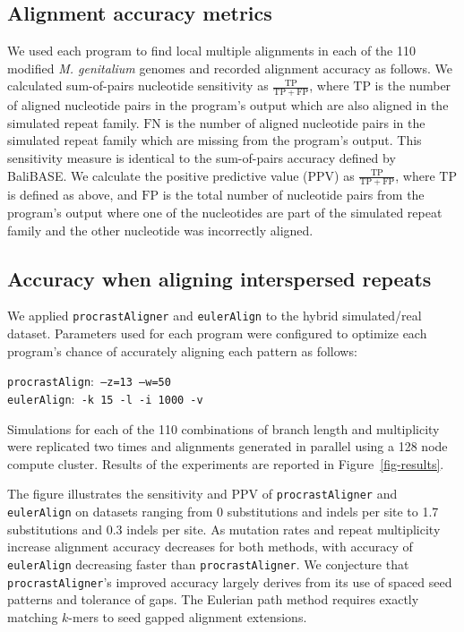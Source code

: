 \documentclass{ws-procs975x65}
\begin{document}
\subsection{Alignment accuracy metrics}
We used each program to find local multiple alignments in each of the 110 modified \emph{M. genitalium} genomes and recorded alignment accuracy as follows. We calculated sum-of-pairs nucleotide sensitivity as $\frac{\mathrm{TP}}{\mathrm{TP} + \mathrm{FP}}$, where $\mathrm{TP}$ is the number of aligned nucleotide pairs in the program's output which are also aligned in the simulated repeat family.  $\mathrm{FN}$ is the number of aligned nucleotide pairs in the simulated repeat family which are missing from the program's output.  This sensitivity measure is identical to the sum-of-pairs accuracy defined by BaliBASE\cite{ref-balibase}.  We calculate the positive predictive value (PPV) as $\frac{\mathrm{TP}}{\mathrm{TP} + \mathrm{FP}}$, where $\mathrm{TP}$ is defined as above, and $\mathrm{FP}$ is the total number of nucleotide pairs from the program's output where one of the nucleotides are part of the simulated repeat family and the other nucleotide was incorrectly aligned.

\subsection{Accuracy when aligning interspersed repeats}
We applied \texttt{procrastAligner} and \texttt{eulerAlign} to the hybrid simulated/real dataset.  Parameters used for each program were configured to optimize each program's chance of accurately aligning each pattern as follows:  \begin{center}\texttt{procrastAlign}:\texttt{ --z=13 --w=50 } \\ \texttt{eulerAlign}:\texttt{ -k 15 -l -i 1000 -v}\end{center}
Simulations for each of the 110 combinations of branch length and multiplicity were replicated two times and alignments generated in parallel using a 128 node compute cluster.  Results of the experiments are reported in Figure~\ref{fig-results}.

The figure illustrates the sensitivity and PPV of \texttt{procrastAligner} and \texttt{eulerAlign} on datasets ranging from 0 substitutions and indels per site to 1.7 substitutions and 0.3 indels per site.  As mutation rates and repeat multiplicity increase alignment accuracy decreases for both methods, with accuracy of \texttt{eulerAlign} decreasing faster than \texttt{procrastAligner}.  We conjecture that \texttt{procrastAligner}'s improved accuracy largely derives from its use of spaced seed patterns\cite{ref-procrast} and tolerance of gaps.  The Eulerian path method requires exactly matching $k$-mers to seed gapped alignment extensions.
\end{document}
